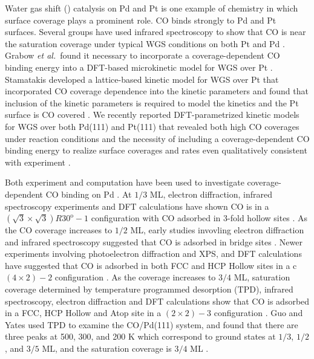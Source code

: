 \documentclass[11pt]{article}
\begin{document}
Water gas shift () catalysis on Pd and Pt is one example of chemistry in which surface coverage plays a prominent role.  CO binds strongly to Pd and Pt surfaces. Several groups have used infrared spectroscopy to show that CO is near the saturation coverage under typical WGS conditions on both Pt and Pd \cite{Bollmann2008, Hilaire2001, Kugai2013, Bunluesin1998, Ollis1981, Olympiou2007, Jr1994, Phatak2007}. %
Grabow \textit{et al.}\ found it necessary to incorporate a coverage-dependent CO binding energy into a DFT-based microkinetic model for WGS over Pt \cite{Grabow2008}.  Stamatakis developed a lattice-based kinetic model for WGS over Pt that incorporated CO coverage dependence into the kinetic parameters and found that inclusion of the kinetic parameters is required to model the kinetics and the Pt surface is CO covered \cite{Stamatakis2011, Stamatakis2011a}. %
We recently reported DFT-parametrized kinetic models for WGS over both Pd(111) and Pt(111) that revealed both high CO coverages under reaction conditions and the necessity of including a coverage-dependent CO binding energy to realize surface coverages and rates even qualitatively consistent with experiment \cite{Clay2014}.

Both experiment and computation have been used to investigate coverage-dependent CO binding on Pd \cite{Chen2012, Tiishaus1990, Ohtani1987, Rose2002, Surnev2000, Guo1989, Bradshaw1978, Hoffmann1983, Schaff1998, Conrad1974, Conrad1978, Sautet2000, Lo1999, Herron2012, Huang2010, Lin2011, Clay2014, Martin2014, Fernandez1997}. At $1/3$ ML, electron diffraction, infrared spectroscopy experiments and DFT calculations have shown CO is in a $(\sqrt{3}\times\sqrt{3})R30^\mathrm{o}-1$  configuration with CO adsorbed in 3-fold hollow sites \cite{Fernandez1997, Ohtani1987, Bradshaw1978, Lo1999}. As the CO coverage increases to $1/2$ ML, early studies invovling electron diffraction and infrared spectroscopy suggested that CO is adsorbed in bridge sites \cite{Ohtani1987, Hoffmann1983}. Newer experiments involving photoelectron diffraction and XPS, and DFT calculations have suggested that CO is adsorbed in both FCC and HCP Hollow sites in a c$(4 \times 2)-2$  configuration \cite{Rose2002, Surnev2000, Schaff1998, Lo1999}. As the coverage increases to $3/4$ ML, saturation coverage determined by temperature programmed desorption (TPD), infrared spectroscopy, electron diffraction and DFT calculations show that CO is adsorbed in a FCC, HCP Hollow and Atop site in a $(2 \times 2)-3$  configuration \cite{Tiishaus1990, Guo1989, Hoffmann1983, Lo1999}. Guo and Yates used TPD to examine the CO/Pd(111) system, and found that there are three peaks at 500, 300, and 200 K which correspond to ground states at $1/3$, $1/2$, and $3/5$ ML, and the saturation coverage is $3/4$ ML \cite{Guo1989}.
\end{document}
